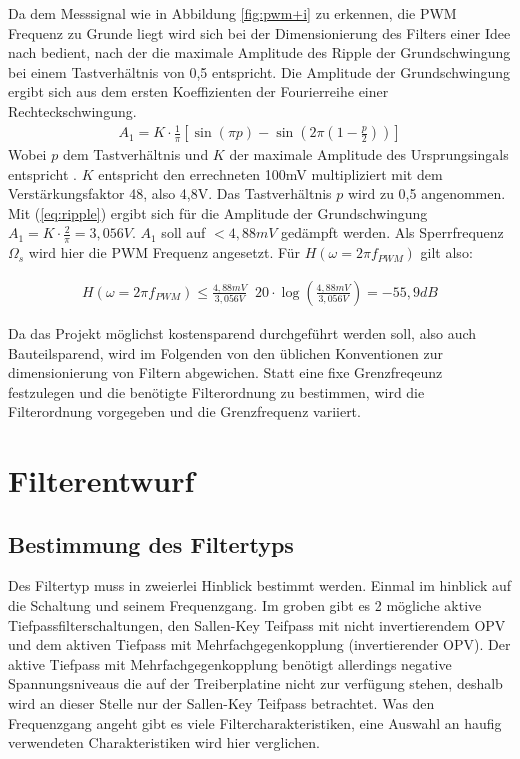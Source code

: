 Da dem Messsignal wie in Abbildung \ref{fig:pwm+i} zu erkennen, die PWM Frequenz zu Grunde liegt wird sich bei der Dimensionierung des Filters einer Idee nach \cite{Alter2008} bedient, nach der die maximale Amplitude des Ripple der Grundschwingung bei einem
Tastverhältnis von 0,5 entspricht. Die Amplitude der Grundschwingung ergibt sich aus dem ersten Koeffizienten der Fourierreihe einer Rechteckschwingung.
\begin{align}
A_1 = K\cdot \frac{1}{\pi}[\sin(\pi p)-\sin(2\pi(1-\frac{p}{2}))]
\label{eq:ripple}
\end{align}
Wobei $p$ dem Tastverhältnis und $K$ der maximale Amplitude des Ursprungsingals entspricht \cite{Alter2008}. $K$ entspricht den errechneten 100mV multipliziert mit dem Verstärkungsfaktor 48, also 4,8V. Das Tastverhältnis $p$ wird zu 0,5
angenommen. Mit (\ref{eq:ripple}) ergibt sich für die Amplitude der Grundschwingung $ A_1 = K\cdot \frac{2}{\pi} = 3,056V$. $A_1$ soll auf $ < 4,88mV$ gedämpft werden.
Als Sperrfrequenz $\Omega_s $ wird hier die PWM Frequenz angesetzt. Für $H(\omega=2\pi f_{PWM})$ gilt also:

\begin{align}
H(\omega=2\pi f_{PWM}) \le \frac{4,88mV}{3,056V} \mathop{\hat{=}} 20\cdot\log(\frac{4,88mV}{3,056V})= -55,9 dB
\label{eq:daempfung}
\end{align}

Da das Projekt möglichst kostensparend durchgeführt werden soll, also auch Bauteilsparend, wird im Folgenden von den üblichen Konventionen zur dimensionierung von Filtern abgewichen.
Statt eine fixe Grenzfreqeunz festzulegen und die benötigte Filterordnung zu bestimmen, wird die Filterordnung vorgegeben und die Grenzfrequenz variiert.

\section{Filterentwurf}

\subsection{Bestimmung des Filtertyps}

Des Filtertyp muss in zweierlei Hinblick bestimmt werden. Einmal im hinblick auf die Schaltung und seinem Frequenzgang.
Im groben gibt es 2 mögliche aktive Tiefpassfilterschaltungen, den Sallen-Key Teifpass mit nicht invertierendem OPV und dem aktiven Tiefpass mit Mehrfachgegenkopplung 
(invertierender OPV). Der aktive Tiefpass mit Mehrfachgegenkopplung benötigt allerdings negative Spannungsniveaus die auf der Treiberplatine nicht zur
verfügung stehen, deshalb wird an dieser Stelle nur der Sallen-Key Teifpass betrachtet.
Was den Frequenzgang angeht gibt es viele Filtercharakteristiken, eine Auswahl an haufig verwendeten Charakteristiken wird hier verglichen.


